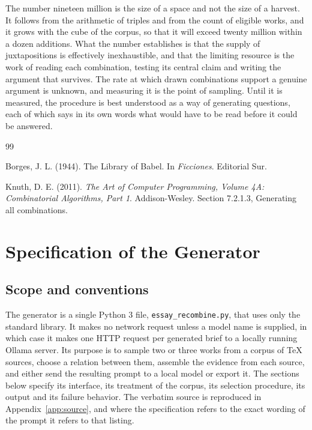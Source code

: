 \documentclass[11pt]{article}
\begin{document}
The number nineteen million is the size of a space and not the size of a harvest. It follows from the arithmetic of triples and from the count of eligible works, and it grows with the cube of the corpus, so that it will exceed twenty million within a dozen additions. What the number establishes is that the supply of juxtapositions is effectively inexhaustible, and that the limiting resource is the work of reading each combination, testing its central claim and writing the argument that survives. The rate at which drawn combinations support a genuine argument is unknown, and measuring it is the point of sampling. Until it is measured, the procedure is best understood as a way of generating questions, each of which says in its own words what would have to be read before it could be answered.

\begin{thebibliography}{99}

 Borges, J. L. (1944). The Library of Babel. In \emph{Ficciones}. Editorial Sur.

 Knuth, D. E. (2011). \emph{The Art of Computer Programming, Volume 4A: Combinatorial Algorithms, Part 1}. Addison-Wesley. Section 7.2.1.3, Generating all combinations.

\end{thebibliography}

\appendix

\section{Specification of the Generator}\label{app:spec}

\subsection{Scope and conventions}

The generator is a single Python 3 file, \texttt{essay\_recombine.py}, that uses only the standard library. It makes no network request unless a model name is supplied, in which case it makes one HTTP request per generated brief to a locally running Ollama server. Its purpose is to sample two or three works from a corpus of \TeX{} sources, choose a relation between them, assemble the evidence from each source, and either send the resulting prompt to a local model or export it. The sections below specify its interface, its treatment of the corpus, its selection procedure, its output and its failure behavior. The verbatim source is reproduced in Appendix~\ref{app:source}, and where the specification refers to the exact wording of the prompt it refers to that listing.
\end{document}
